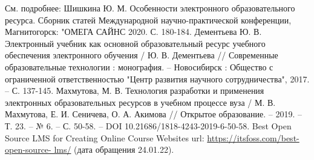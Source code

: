\begin{thebibliography}{99}
  См. подробнее: Шишкина  Ю. М. Особенности электронного образовательного ресурса. Сборник статей Международной научно-практической конференции, Магнитогорск: "ОМЕГА САЙНС 2020. С. 180-184.
  Дементьева Ю. В. Электронный учебник как основной образовательный ресурс учебного обеспечения электронного обучения / Ю. В. Дементьева // Современные образовательные технологии : монография. – Новосибирск : Общество с ограниченной ответственностью "Центр развития научного сотрудничества", 2017. – С. 137-145.
  Махмутова, М. В. Технология разработки и применения электронных образовательных ресурсов в учебном процессе вуза / М. В. Махмутова, Е. И. Сеничева, О. А. Акимова // Открытое образование. – 2019. – Т. 23. – № 6. – С. 50-58. – DOI 10.21686/1818-4243-2019-6-50-58.
  Best Open Source LMS for Creating Online Course Websites url: \url{https://itsfoss.com/best-open-source- lms/} (дата обращения 24.01.22).
\end{thebibliography}
